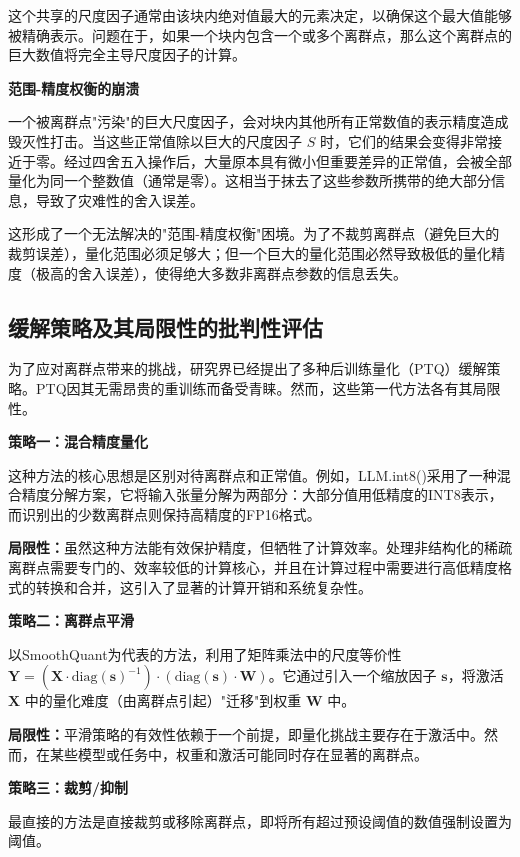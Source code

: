 \documentclass[letterpaper,twocolumn,10pt]{article}
\begin{document}
这个共享的尺度因子通常由该块内绝对值最大的元素决定，以确保这个最大值能够被精确表示。问题在于，如果一个块内包含一个或多个离群点，那么这个离群点的巨大数值将完全主导尺度因子的计算。

\textbf{范围-精度权衡的崩溃}

一个被离群点"污染"的巨大尺度因子，会对块内其他所有正常数值的表示精度造成毁灭性打击。当这些正常值除以巨大的尺度因子 $S$ 时，它们的结果会变得非常接近于零。经过四舍五入操作后，大量原本具有微小但重要差异的正常值，会被全部量化为同一个整数值（通常是零）。这相当于抹去了这些参数所携带的绝大部分信息，导致了灾难性的舍入误差。

这形成了一个无法解决的"范围-精度权衡"困境。为了不裁剪离群点（避免巨大的裁剪误差），量化范围必须足够大；但一个巨大的量化范围必然导致极低的量化精度（极高的舍入误差），使得绝大多数非离群点参数的信息丢失。

\subsection{缓解策略及其局限性的批判性评估}

为了应对离群点带来的挑战，研究界已经提出了多种后训练量化（PTQ）缓解策略。PTQ因其无需昂贵的重训练而备受青睐。然而，这些第一代方法各有其局限性。

\textbf{策略一：混合精度量化}

这种方法的核心思想是区别对待离群点和正常值。例如，LLM.int8()采用了一种混合精度分解方案，它将输入张量分解为两部分：大部分值用低精度的INT8表示，而识别出的少数离群点则保持高精度的FP16格式。

\textbf{局限性：}虽然这种方法能有效保护精度，但牺牲了计算效率。处理非结构化的稀疏离群点需要专门的、效率较低的计算核心，并且在计算过程中需要进行高低精度格式的转换和合并，这引入了显著的计算开销和系统复杂性。

\textbf{策略二：离群点平滑}

以SmoothQuant为代表的方法，利用了矩阵乘法中的尺度等价性 $\mathbf{Y} = (\mathbf{X} \cdot \text{diag}(\mathbf{s})^{-1}) \cdot (\text{diag}(\mathbf{s}) \cdot \mathbf{W})$。它通过引入一个缩放因子 $\mathbf{s}$，将激活 $\mathbf{X}$ 中的量化难度（由离群点引起）"迁移"到权重 $\mathbf{W}$ 中。

\textbf{局限性：}平滑策略的有效性依赖于一个前提，即量化挑战主要存在于激活中。然而，在某些模型或任务中，权重和激活可能同时存在显著的离群点。

\textbf{策略三：裁剪/抑制}

最直接的方法是直接裁剪或移除离群点，即将所有超过预设阈值的数值强制设置为阈值。
\end{document}
